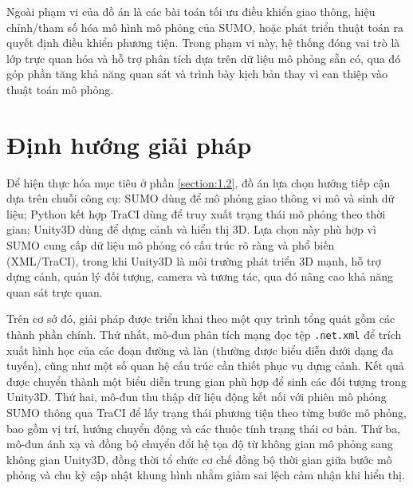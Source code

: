 \documentclass[../DoAn.tex]{subfiles}
\begin{document}
Ngoài phạm vi của đồ án là các bài toán tối ưu điều khiển giao thông, hiệu chỉnh/tham số hóa mô hình mô phỏng của SUMO, hoặc phát triển thuật toán ra quyết định điều khiển phương tiện. Trong phạm vi này, hệ thống đóng vai trò là lớp trực quan hóa và hỗ trợ phân tích dựa trên dữ liệu mô phỏng sẵn có, qua đó góp phần tăng khả năng quan sát và trình bày kịch bản thay vì can thiệp vào thuật toán mô phỏng.

\section{Định hướng giải pháp}
\label{section:1.3}


Để hiện thực hóa mục tiêu ở phần \ref{section:1.2}, đồ án lựa chọn hướng tiếp cận dựa trên chuỗi công cụ: SUMO dùng để mô phỏng giao thông vi mô và sinh dữ liệu; Python kết hợp TraCI dùng để truy xuất trạng thái mô phỏng theo thời gian; Unity3D dùng để dựng cảnh và hiển thị 3D. Lựa chọn này phù hợp vì SUMO cung cấp dữ liệu mô phỏng có cấu trúc rõ ràng và phổ biến (XML/TraCI), trong khi Unity3D là môi trường phát triển 3D mạnh, hỗ trợ dựng cảnh, quản lý đối tượng, camera và tương tác, qua đó nâng cao khả năng quan sát trực quan.

Trên cơ sở đó, giải pháp được triển khai theo một quy trình tổng quát gồm các thành phần chính. Thứ nhất, mô-đun phân tích mạng đọc tệp \texttt{.net.xml} để trích xuất hình học của các đoạn đường và làn (thường được biểu diễn dưới dạng đa tuyến), cũng như một số quan hệ cấu trúc cần thiết phục vụ dựng cảnh. Kết quả được chuyển thành một biểu diễn trung gian phù hợp để sinh các đối tượng trong Unity3D. Thứ hai, mô-đun thu thập dữ liệu động kết nối với phiên mô phỏng SUMO thông qua TraCI để lấy trạng thái phương tiện theo từng bước mô phỏng, bao gồm vị trí, hướng chuyển động và các thuộc tính trạng thái cơ bản. Thứ ba, mô-đun ánh xạ và đồng bộ chuyển đổi hệ tọa độ từ không gian mô phỏng sang không gian Unity3D, đồng thời tổ chức cơ chế đồng bộ thời gian giữa bước mô phỏng và chu kỳ cập nhật khung hình nhằm giảm sai lệch cảm nhận khi hiển thị.
\end{document}
